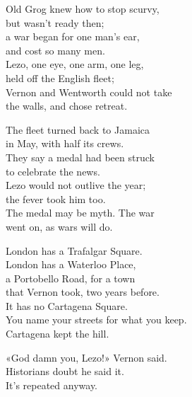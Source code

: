 \begin{lyrics}
Old Grog knew how to stop scurvy,\\
but wasn't ready then;\\
a war began for one man's ear,\\
and cost so many men.\\
Lezo, one eye, one arm, one leg,\\
held off the English fleet;\\
Vernon and Wentworth could not take\\
the walls, and chose retreat.

The fleet turned back to Jamaica\\
in May, with half its crews.\\
They say a medal had been struck\\
to celebrate the news.\\
Lezo would not outlive the year;\\
the fever took him too.\\
The medal may be myth. The war\\
went on, as wars will do.

London has a Trafalgar Square.\\
London has a Waterloo Place,\\
a Portobello Road, for a town\\
that Vernon took, two years before.\\
It has no Cartagena Square.\\
You name your streets for what you keep.\\
Cartagena kept the hill.

«God damn you, Lezo!» Vernon said.\\
Historians doubt he said it.\\
It's repeated anyway.
\end{lyrics}

